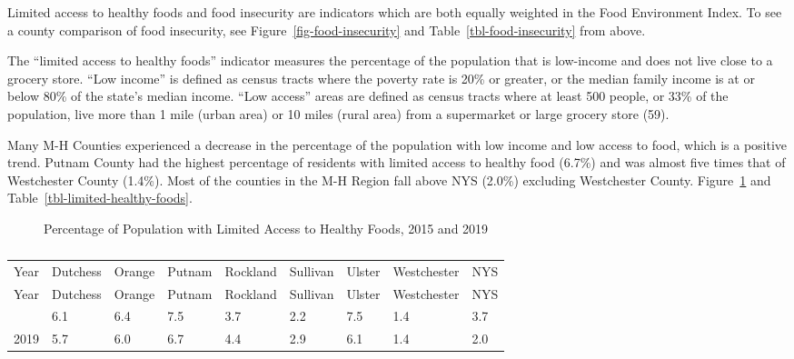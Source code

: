 \documentclass[
  english,
  letterpaper,
]{report}
\begin{document}
Limited access to healthy foods and food insecurity are indicators which
are both equally weighted in the Food Environment Index. To see a county
comparison of food insecurity, see Figure~\ref{fig-food-insecurity} and
Table~\ref{tbl-food-insecurity} from above.

The ``limited access to healthy foods'' indicator measures the
percentage of the population that is low-income and does not live close
to a grocery store. ``Low income'' is defined as census tracts where the
poverty rate is 20\% or greater, or the median family income is at or
below 80\% of the state's median income. ``Low access'' areas are
defined as census tracts where at least 500 people, or 33\% of the
population, live more than 1 mile (urban area) or 10 miles (rural area)
from a supermarket or large grocery store (59).

Many M-H Counties experienced a decrease in the percentage of the
population with low income and low access to food, which is a positive
trend. Putnam County had the highest percentage of residents with
limited access to healthy food (6.7\%) and was almost five times that of
Westchester County (1.4\%). Most of the counties in the M-H Region fall
above NYS (2.0\%) excluding Westchester County.
Figure~\ref{fig-limited-healthy-foods} and
Table~\ref{tbl-limited-healthy-foods}.

\begin{figure}


\caption{\label{fig-limited-healthy-foods}Percentage of Population with
Limited Access to Healthy Foods, 2015 and 2019}

\end{figure}%

\begin{longtable}[]{@{}lllllllll@{}}

\caption{\label{tbl-limited-healthy-foods}Percentage of Population with
Limited Access to Healthy Foods, 2015 and 2019}

\tabularnewline

\caption{}\label{T_e4db5}\tabularnewline
\toprule\noalign{}
Year & Dutchess & Orange & Putnam & Rockland & Sullivan & Ulster &
Westchester & NYS \\
\midrule\noalign{}
\endfirsthead
\toprule\noalign{}
Year & Dutchess & Orange & Putnam & Rockland & Sullivan & Ulster &
Westchester & NYS \\
\midrule\noalign{}
\endhead
\bottomrule\noalign{}
\endlastfoot
2015 & 6.1 & 6.4 & 7.5 & 3.7 & 2.2 & 7.5 & 1.4 & 3.7 \\
2019 & 5.7 & 6.0 & 6.7 & 4.4 & 2.9 & 6.1 & 1.4 & 2.0 \\

\end{longtable}
\end{document}
